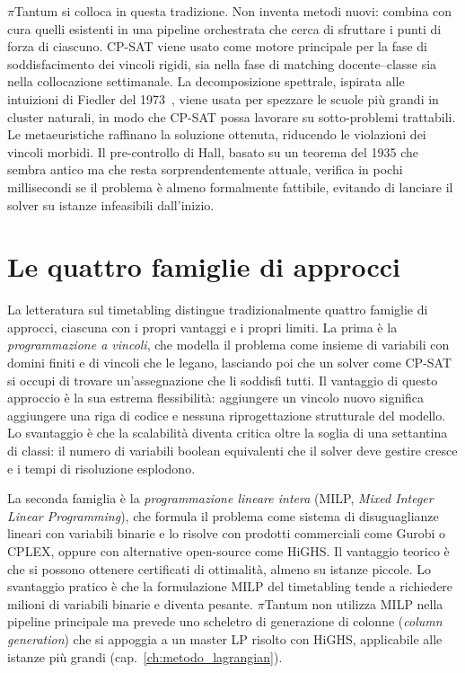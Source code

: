 $\pi$Tantum si colloca in questa tradizione. Non inventa
metodi nuovi: combina con cura quelli esistenti in una
pipeline orchestrata che cerca di sfruttare i punti di forza
di ciascuno. CP-SAT viene usato come motore principale per
la fase di soddisfacimento dei vincoli rigidi, sia nella
fase di matching docente--classe sia nella collocazione
settimanale. La decomposizione spettrale, ispirata alle
intuizioni di Fiedler del 1973~\parencite{fiedler1973}, viene
usata per spezzare le scuole pi\`u grandi in cluster
naturali, in modo che CP-SAT possa lavorare su sotto-problemi
trattabili. Le metaeuristiche raffinano la soluzione
ottenuta, riducendo le violazioni dei vincoli morbidi.
Il pre-controllo di Hall, basato su un teorema del 1935 che
sembra antico ma che resta sorprendentemente attuale,
verifica in pochi millisecondi se il problema \`e almeno
formalmente fattibile, evitando di lanciare il solver su
istanze infeasibili dall'inizio.

\section{Le quattro famiglie di approcci}

La letteratura sul timetabling distingue tradizionalmente
quattro famiglie di approcci, ciascuna con i propri vantaggi
e i propri limiti. La prima \`e la \emph{programmazione a
vincoli}, che modella il problema come insieme di variabili
con domini finiti e di vincoli che le legano, lasciando poi
che un solver come CP-SAT si occupi di trovare un'assegnazione
che li soddisfi tutti. Il vantaggio di questo approccio \`e la
sua estrema flessibilit\`a: aggiungere un vincolo nuovo
significa aggiungere una riga di codice e nessuna riprogettazione
strutturale del modello. Lo svantaggio \`e che la scalabilit\`a
diventa critica oltre la soglia di una settantina di classi:
il numero di variabili boolean equivalenti che il solver deve
gestire cresce e i tempi di risoluzione esplodono.

La seconda famiglia \`e la \emph{programmazione lineare intera}
(MILP, \emph{Mixed Integer Linear Programming}), che formula
il problema come sistema di disuguaglianze lineari con
variabili binarie e lo risolve con prodotti commerciali come
Gurobi o CPLEX, oppure con alternative open-source come HiGHS.
Il vantaggio teorico \`e che si possono ottenere certificati
di ottimalit\`a, almeno su istanze piccole. Lo svantaggio
pratico \`e che la formulazione MILP del timetabling tende a
richiedere milioni di variabili binarie e diventa pesante.
$\pi$Tantum non utilizza MILP nella pipeline principale ma
prevede uno scheletro di generazione di colonne (\emph{column
generation}) che si appoggia a un master LP risolto con HiGHS,
applicabile alle istanze pi\`u grandi (cap.~\ref{ch:metodo_lagrangian}).

